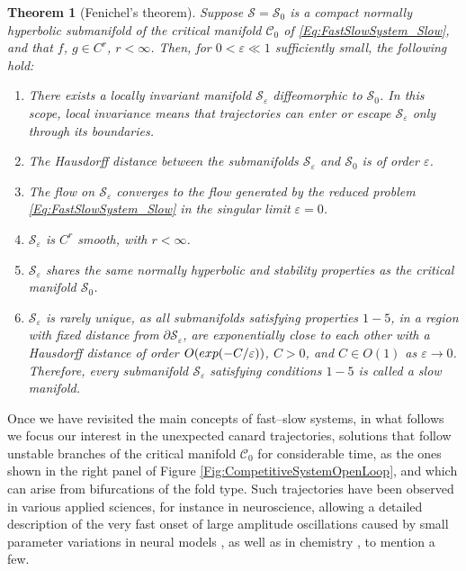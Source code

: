 \documentclass[3p]{elsarticle}
\theoremstyle{plain}
\newtheorem{theorem}{Theorem}[section]
\theoremstyle{remark}
\theoremstyle{definition}
\begin{document}
        \begin{theorem}[Fenichel's theorem]
            Suppose $\mathcal{S}=\mathcal{S}_{0}$ is a compact normally hyperbolic submanifold of the critical manifold $\mathcal{C}_{0}$ of \eqref{Eq:FastSlowSystem_Slow}, and that $f$, $g\in C^{r}$, $r<\infty$. Then, for  $0<\varepsilon\ll1$ sufficiently small, the following hold:
            \begin{enumerate}
                \item There exists a locally invariant manifold $\mathcal{S}_{\varepsilon}$ diffeomorphic to $\mathcal{S}_{0}$. In this scope, local invariance means that trajectories can enter or escape $\mathcal{S}_{\varepsilon}$ only through its boundaries.
                \item The Hausdorff distance between the submanifolds $\mathcal{S}_{\varepsilon}$ and $\mathcal{S}_{0}$ is of order $\varepsilon$.
                \item The flow on $\mathcal{S}_{\varepsilon}$ converges to the flow generated by the reduced problem \eqref{Eq:FastSlowSystem_Slow} in the singular limit $\varepsilon=0$.
                \item $\mathcal{S}_{\varepsilon}$ is $C^{r}$ smooth, with $r<\infty$.
                \item $\mathcal{S}_{\varepsilon}$ shares the same normally hyperbolic and stability properties as the critical manifold $\mathcal{S}_{0}$.
                \item $\mathcal{S}_{\varepsilon}$ is rarely unique, as all submanifolds satisfying properties $1-5$, in a region with fixed distance from $\partial \mathcal{S}_{\varepsilon}$, are exponentially close to each other with a Hausdorff distance of order $O(\emph{exp}(-C/\varepsilon))$, $C>0$, and $C\in O(1)$ as $\varepsilon \rightarrow 0$. Therefore, every submanifold $\mathcal{S}_{\varepsilon}$ satisfying conditions $1-5$ is called a \emph{slow manifold}.
            \end{enumerate}
            \label{Thm:Fenichel}
        \end{theorem}

        Once we have revisited the main concepts of fast--slow systems, in what follows we focus our interest in the unexpected canard trajectories, solutions that follow unstable branches of the critical manifold $\mathcal{C}_{0}$ for considerable time, as the ones shown in the right panel of Figure \ref{Fig:CompetitiveSystemOpenLoop}, and which can arise from bifurcations of the fold type. Such trajectories have been observed in various applied sciences, for instance in neuroscience, allowing a detailed description of the very fast onset of large amplitude oscillations caused by small parameter variations in neural models \cite{Ref:Izhikevich2006, Ref:Ermentrout2009, Ref:Ermentrout2010, Ref:Koskal2021}, as well as in chemistry \cite{Ref:Brons1991, Ref:Milik2001, Ref:Moehlis2002}, to mention a few.
\end{document}
